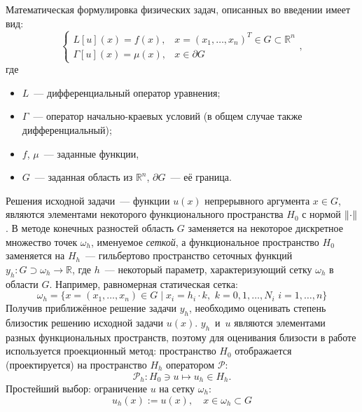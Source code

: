 Математическая формулировка физических задач, описанных во введении имеет вид:
\begin{equation}\label{eq:InitialProblem}
    \begin{cases}
        L[u](x) = f(x), & x = (x_1, \ldots, x_n)^{T} \in G \subset \mathbb{R}^n\\
        \Gamma[u](x) = \mu(x), & x \in \partial G
    \end{cases}, 
\end{equation}
где 
\begin{itemize}
    \item $L$~--- дифференциальный оператор уравнения;
    \item $\Gamma$~--- оператор начально-краевых условий (в общем случае также дифференциальный);
    \item $f$, $\mu$~--- заданные функции,
    \item $G$~--- заданная область из $\mathbb{R}^n$, $\partial G$~--- её граница.
\end{itemize}
Решения исходной задачи~--- функции $u(x)$ непрерывного аргумента $x \in G$, являются элементами некоторого функционального пространства $H_0$ с нормой $\lVert\cdot\rVert$.
В методе конечных разностей область $G$ заменяется на некоторое дискретное множество точек $\omega_h$, именуемое \emph{сеткой}, а функциональное пространство $H_0$ заменяется на $H_h$~--- гильбертово пространство сеточных функций ${y_h : G \supset \omega_h \rightarrow \mathbb{R}}$, где $h$~--- некоторый параметр, характеризующий сетку $\omega_h$ в области $G$.
Например, равномерная статическая сетка:
\begin{equation*}
    \omega_h = \{x = (x_1, \ldots, x_n) \in G \mid x_i = h_i \cdot k,\,\, k = 0, 1, \ldots, N_i\,\, i = 1, \ldots, n\}
\end{equation*}
Получив приближённое решение задачи $y_h$, необходимо оценивать степень \glqq близости\grqq к решению исходной задачи $u(x)$.
$y_h$~и~$u$ являются элементами разных функциональных пространств, поэтому для оценивания близости в работе используется проекционный метод: пространство $H_0$ отображается (проектируется) на пространство $H_h$ оператором $\mathcal{P}$:
\begin{equation*}
    \mathcal{P}_h \colon H_0 \ni u \mapsto u_h \in H_h.
\end{equation*}
Простейший выбор: ограничение $u$ на сетку $\omega_h$:
\begin{equation*}
    u_h(x) := u(x),\quad x \in \omega_h \subset G
\end{equation*}
